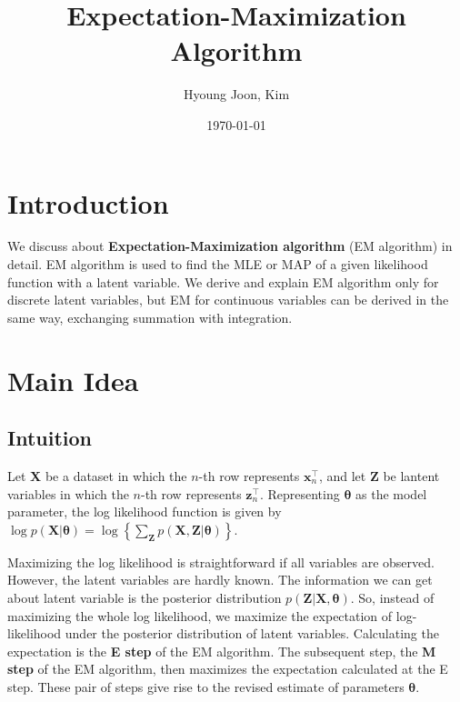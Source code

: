 \documentclass{article}
\title{Expectation-Maximization Algorithm}
\author{Hyoung Joon, Kim}
\date{\today}
\begin{document}
\maketitle
\tableofcontents
\newpage

\section{Introduction}
    We discuss about \textbf{Expectation-Maximization algorithm} (EM algorithm) in detail.
    EM algorithm is used to find the MLE or MAP of a given likelihood function with a latent variable.
    We derive and explain EM algorithm only for discrete latent variables, but EM for continuous variables can be derived in the same way,
    exchanging summation with integration.

\section{Main Idea}
    \subsection{Intuition}
        Let \textbf{X} be a dataset in which the $n$-th row represents $\textbf{x}_n^{\top}$,
        and let \textbf{Z} be lantent variables in which the $n$-th row represents $\textbf{z}_n^{\top}$.
        Representing $\bm\theta$ as the model parameter, the log likelihood function is given by
        $\log{p(\textbf{X}|\bm\theta)}=\log{\left\{ \sum_{\textbf{Z}}p(\textbf{X},\textbf{Z}|\bm\theta) \right\}}$.
        
        Maximizing the log likelihood is straightforward if all variables are observed. However, the latent variables are
        hardly known. The information we can get about latent variable is the posterior distribution $p(\textbf{Z}|\textbf{X},\bm\theta)$.
        So, instead of maximizing the whole log likelihood, we maximize the expectation of log-likelihood under the posterior distribution of 
        latent variables. Calculating the expectation is the \textbf{E step} of the EM algorithm.
        The subsequent step, the \textbf{M step} of the EM algorithm, then maximizes the expectation calculated at the E step.
        These pair of steps give rise to the revised estimate of parameters $\bm\theta$.
        
\end{document}

